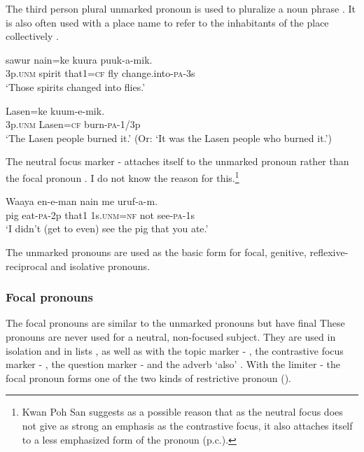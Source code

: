 The third person plural unmarked pronoun is used to pluralize a noun phrase . It is also often used with a place name to refer to the inhabitants of the place collectively .

\ea%
\label{ex:3:x625}
\gll {} sawur nain=ke kuura puuk-a-mik. \\
3p.\textsc{unm} spirit that1=\textsc{cf} fly change.into-\textsc{pa}-3s\\
\glt`Those spirits changed into flies.'
\z

\ea%
\label{ex:3:x626}
\gll {} Lasen=ke kuum-e-mik. \\
3p.\textsc{unm} Lasen=\textsc{cf} burn-\textsc{pa}-1/3p\\
\glt`The Lasen people burned it.' (Or: `It was the Lasen people who burned it.')
\z

The neutral focus marker - attaches itself to the unmarked pronoun rather than the focal pronoun . I do not know the reason for this.\footnote{Kwan Poh San suggests as a possible reason that as the neutral focus does not give as strong an emphasis as the contrastive focus, it also attaches itself to a less emphasized form of the pronoun (p.c.).}

\ea%
\label{ex:3:x547}
\gll Waaya en-e-man nain  me uruf-a-m. \\
pig eat-\textsc{pa}-2p that1 1s.\textsc{unm}=\textsc{nf} not see-\textsc{pa}-1s \\
\glt`I didn't (get to even) see the pig that you ate.'
\z

The unmarked pronouns are used as the basic form for focal, genitive, reflexive-recip\-rocal and isolative pronouns.

\subsubsection{Focal pronouns}
{}
The focal pronouns are similar to the unmarked pronouns but have final  These pronouns are never used for a neutral, non-focused subject. They are used in isolation and in lists , as well as with the topic marker - , the contrastive focus marker - , the question marker -  and the adverb  `also' . With the limiter -  the focal pronoun forms one of the two kinds of restrictive pronoun ().

